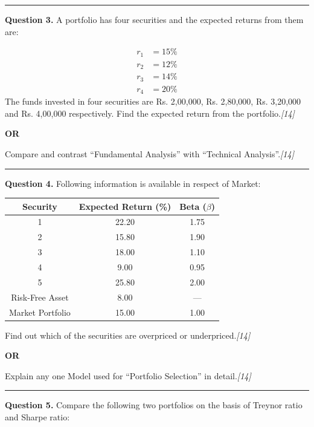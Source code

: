 \documentclass[11pt,a4paper]{article}
\newcommand{\pts}[1]{\hfill   \textit{[#1]}}
\begin{document}
\medskip\rule{\linewidth}{0.2pt}




\noindent   \textbf{Question 3.}
A portfolio has four securities and the expected returns from them are:

\begin{align*}
  r_1 &= 15\% \\
  r_2 &= 12\% \\
  r_3 &= 14\% \\
  r_4 &= 20\%
\end{align*}
The funds invested in four securities are Rs. 2,00,000, Rs. 2,80,000, Rs. 3,20,000 and Rs. 4,00,000 respectively. Find the expected return from the portfolio.\pts{14}

\centerline{   \textbf{OR}}

Compare and contrast ``Fundamental Analysis'' with ``Technical Analysis''.\pts{14}

\medskip\rule{\linewidth}{0.2pt}




\noindent   \textbf{Question 4.}
Following information is available in respect of Market:

\begin{center}

\begin{tabular}{|c|c|c|}
\hline
   \textbf{Security} &   \textbf{Expected Return (\%)} &   \textbf{Beta ($\beta$)} \\ \hline
1 & 22.20 & 1.75 \\ \hline
2 & 15.80 & 1.90 \\ \hline
3 & 18.00 & 1.10 \\ \hline
4 & 9.00 & 0.95 \\ \hline
5 & 25.80 & 2.00 \\ \hline
Risk-Free Asset & 8.00 & --- \\ \hline
Market Portfolio & 15.00 & 1.00 \\ \hline
\end{tabular}
\end{center}
Find out which of the securities are overpriced or underpriced.\pts{14}

\centerline{   \textbf{OR}}

Explain any one Model used for ``Portfolio Selection'' in detail.\pts{14}

\medskip\rule{\linewidth}{0.2pt}




\noindent   \textbf{Question 5.}
Compare the following two portfolios on the basis of Treynor ratio and Sharpe ratio:
\end{document}
